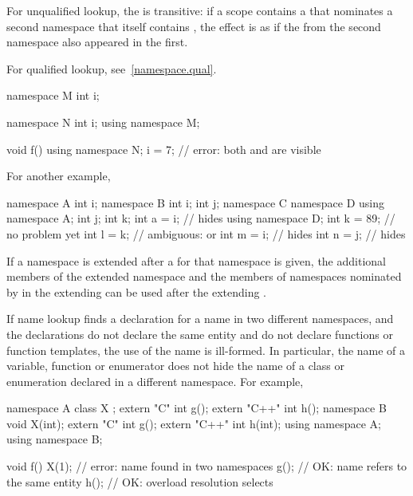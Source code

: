 \pnum
For unqualified lookup, the
 is transitive: if a scope contains a
 that nominates a second namespace that itself
contains , the effect is as if the
 from the second namespace also appeared in
the first.
\begin{note}
For qualified lookup, see~\ref{namespace.qual}.
\end{note}
\begin{example}
\begin{codeblock}
namespace M {
  int i;
}

namespace N {
  int i;
  using namespace M;
}

void f() {
  using namespace N;
  i = 7;            // error: both  and  are visible
}
\end{codeblock}

For another example,
\begin{codeblock}
namespace A {
  int i;
}
namespace B {
  int i;
  int j;
  namespace C {
    namespace D {
      using namespace A;
      int j;
      int k;
      int a = i;    //  hides 
    }
    using namespace D;
    int k = 89;     // no problem yet
    int l = k;      // ambiguous:  or 
    int m = i;      //  hides 
    int n = j;      //  hides 
  }
}
\end{codeblock}
\end{example}


\pnum
If a namespace is extended after a
 for that namespace is given, the additional
members of the extended namespace and the members of namespaces
nominated by  in the
extending  can be used after the
extending .

\pnum
\begin{note}
If name lookup finds a declaration for a name in two different
namespaces, and the declarations do not declare the same entity and do
not declare functions or function templates, the use of the name is ill-formed.
In particular, the name of a variable, function or enumerator does not
hide the name of a class or enumeration declared in a different
namespace. For example,

\begin{codeblock}
namespace A {
  class X { };
  extern "C"   int g();
  extern "C++" int h();
}
namespace B {
  void X(int);
  extern "C"   int g();
  extern "C++" int h(int);
}
using namespace A;
using namespace B;

void f() {
  X(1);             // error: name  found in two namespaces
  g();              // OK: name  refers to the same entity
  h();              // OK: overload resolution selects 
}
\end{codeblock}
\end{note}

